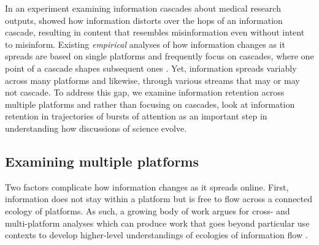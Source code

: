 \documentclass[letterpaper]{article} %
\begin{document}
In an experiment examining information cascades about medical research outputs, \citet{ribeiroMessageDistortionInformation2019} showed how information distorts over the hops of an information cascade, resulting in content that resembles misinformation even without intent to misinform.
Existing \textit{empirical} analyses of how information changes as it spreads are based on single platforms and frequently focus on cascades, where one point of a cascade shapes subsequent ones \citep{easleyInformationCascades2010}. Yet, information spreads variably across many platforms and likewise, through various streams that may or may not cascade. To address this gap, we examine information retention across multiple platforms and rather than focusing on cascades, look at information retention in trajectories of bursts of attention as an important step in understanding how discussions of science evolve.


\subsection{Examining multiple platforms}
Two factors complicate how information changes as it spreads online. First, information does not stay within a platform but is free to flow across a connected ecology of platforms. As such, a growing body of work argues for cross- and multi-platform analyses which can produce work that goes beyond particular use contexts to develop higher-level understandings of ecologies of information flow \citep{hillStudyingPopulationsOnline2019,phadkeManyFacedHate2020,zakhlebinDiffusionScientificArticles2020,horvatBirdsFeatherFlock2021}.%
\end{document}
